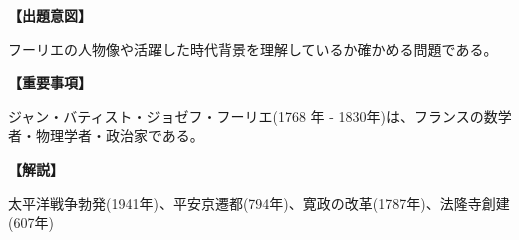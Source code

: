 \noindent \textbf{【出題意図】}

\noindent フーリエの人物像や活躍した時代背景を理解しているか確かめる問題である。

\vspace{1em}
\noindent \textbf{【重要事項】}

ジャン・バティスト・ジョゼフ・フーリエ(1768 年 - 1830年)は、フランスの数学者・物理学者・政治家である。

\vspace{1em}
\noindent \textbf{【解説】}

\noindent 太平洋戦争勃発(1941年)、平安京遷都(794年)、寛政の改革(1787年)、法隆寺創建(607年)
